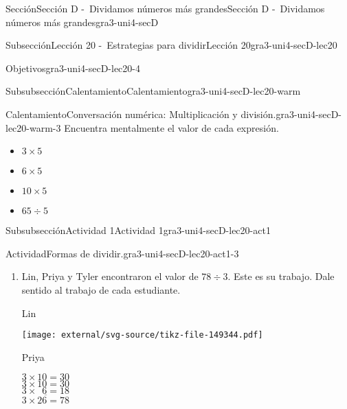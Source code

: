 \documentclass[twoside,14pt,]{extarticle}
\begin{document}
\begin{sectionptx}{Sección}{Sección D -~Dividamos números más grandes}{}{Sección D -~Dividamos números más grandes}{}{}{gra3-uni4-secD}
\begin{subsectionptx}{Subsección}{Lección 20 -~Estrategias para dividir}{}{Lección 20}{}{}{gra3-uni4-secD-lec20}
\begin{objectives}{Objetivos}{gra3-uni4-secD-lec20-4}
\end{objectives}
%
%
\typeout{************************************************}
\typeout{************************************************}
%
\begin{subsubsectionptx}{Subsubsección}{Calentamiento}{}{Calentamiento}{}{}{gra3-uni4-secD-lec20-warm}
\begin{exploration}{Calentamiento}{Conversación numérica: Multiplicación y división.}{gra3-uni4-secD-lec20-warm-3}%
Encuentra mentalmente el valor de cada expresión.%
%
\begin{itemize}[label=\textbullet]
\item{}\(\displaystyle 3\times 5\)%
\item{}\(\displaystyle 6\times 5\)%
\item{}\(\displaystyle 10\times 5\)%
\item{}\(\displaystyle 65\div 5\)%
\end{itemize}
\end{exploration}%
\end{subsubsectionptx}
%
%
\typeout{************************************************}
\typeout{************************************************}
%
\begin{subsubsectionptx}{Subsubsección}{Actividad 1}{}{Actividad 1}{}{}{gra3-uni4-secD-lec20-act1}
\begin{activity}{Actividad}{Formas de dividir.}{gra3-uni4-secD-lec20-act1-3}%
%
\begin{enumerate}
\item{}Lin, Priya y Tyler encontraron el valor de \(78 \div 3\). Este es su trabajo. Dale sentido al trabajo de cada estudiante.%
\par
Lin%
\par
\begin{image}{0}{1}{0}{}%
\texttt{[image: external/svg-source/tikz-file-149344.pdf]}
\end{image}%
%
\begin{sidebyside}{2}{0}{0}{0}%
\begin{sbspanel}{0.5}%
Priya%
\par
\(3\times 10 = 30\)\\
 \(3\times 10 = 30\)\\
 \(3\times \phantom{0}6 = 18\)\\
 \(\overline {3 \times 26 =78}\)%
\end{sbspanel}%
\begin{sbspanel}{0.5}%

\end{sbspanel}
\end{sidebyside}
\end{enumerate}
\end{activity}
\end{subsubsectionptx}
\end{subsectionptx}
\end{sectionptx}
\end{document}
